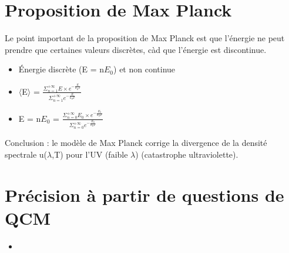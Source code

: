 \documentclass{article}
\begin{document}
\section{Proposition de Max Planck}
Le point important de la proposition de Max Planck est que l'énergie ne peut prendre que certaines valeurs discrètes, càd que l'énergie est discontinue.
\begin{itemize}
    \item Énergie discrète (E = n$E_{0}$) et non continue
    \item $\langle$E$\rangle$ = $\frac{\Sigma_{n=1}^{+\infty} E \times e^{-\frac{E}{k_{B}T}}}{\Sigma_{n=1}^{+\infty} e^{-\frac{E}{k_{B}T}}}$
    \item E = n$E_{0}$ = $\frac{\Sigma_{n=0}^{+\infty} E_{0} \times e^{-\frac{E_{0}}{k_{B}T}}}{\Sigma_{n=0}^{+\infty} e^{-\frac{E_{0}}{k_{B}T}}}$
\end{itemize}
Conclusion : le modèle de Max Planck corrige la divergence de la densité spectrale u($\lambda$,T) pour l'UV (faible $\lambda$) (catastrophe ultraviolette).

\section{Précision à partir de questions de QCM}
\begin{itemize}
    \item
\end{itemize}
\end{document}
